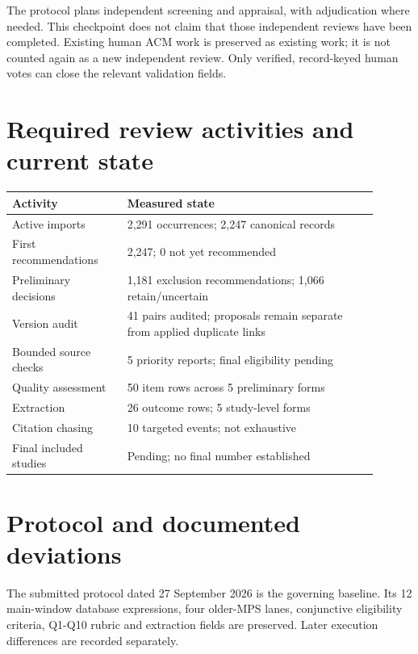 \documentclass[12pt,a4paper]{article}
\begin{document}
The protocol plans independent screening and appraisal, with adjudication where needed. This checkpoint does not claim that those independent reviews have been completed. Existing human ACM work is preserved as existing work; it is not counted again as a new independent review. Only verified, record-keyed human votes can close the relevant validation fields.


\section{Required review activities and current state}
\begin{longtable}{p{0.29\linewidth}p{0.61\linewidth}}
\toprule
Activity & Measured state\\\midrule
\endhead
Active imports & 2,291 occurrences; 2,247 canonical records\\
First recommendations & 2,247; 0 not yet recommended\\
Preliminary decisions & 1,181 exclusion recommendations; 1,066 retain/\allowbreak{}uncertain\\
Version audit & 41 pairs audited; proposals remain separate from applied duplicate links\\
Bounded source checks & 5 priority reports; final eligibility pending\\
Quality assessment & 50 item rows across 5 preliminary forms\\
Extraction & 26 outcome rows; 5 study-level forms\\
Citation chasing & 10 targeted events; not exhaustive\\
Final included studies & Pending; no final number established\\
\bottomrule
\end{longtable}

\section{Protocol and documented deviations}
The submitted protocol dated 27 September 2026 is the governing baseline. Its 12 main-window database expressions, four older-MPS lanes, conjunctive eligibility criteria, Q1-Q10 rubric and extraction fields are preserved. Later execution differences are recorded separately.
\end{document}
